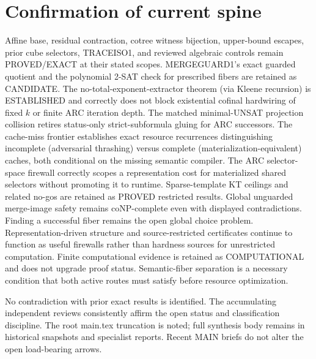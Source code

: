 \documentclass[11pt]{article}
\begin{document}
\section{Confirmation of current spine}
Affine base, residual contraction, cotree witness bijection, upper-bound escapes, prior cube selectors, TRACEISO1, and reviewed algebraic controls remain PROVED/EXACT at their stated scopes. MERGEGUARD1's exact guarded quotient and the polynomial 2-SAT check for prescribed fibers are retained as CANDIDATE. The no-total-exponent-extractor theorem (via Kleene recursion) is ESTABLISHED and correctly does not block existential cofinal hardwiring of fixed \(k\) or finite ARC iteration depth. The matched minimal-UNSAT projection collision retires status-only strict-subformula gluing for ARC successors. The cache-miss frontier establishes exact resource recurrences distinguishing incomplete (adversarial thrashing) versus complete (materialization-equivalent) caches, both conditional on the missing semantic compiler. The ARC selector-space firewall correctly scopes a representation cost for materialized shared selectors without promoting it to runtime. Sparse-template KT ceilings and related no-gos are retained as PROVED restricted results. Global unguarded merge-image safety remains coNP-complete even with displayed contradictions. Finding a successful fiber remains the open global choice problem. Representation-driven structure and source-restricted certificates continue to function as useful firewalls rather than hardness sources for unrestricted computation. Finite computational evidence is retained as COMPUTATIONAL and does not upgrade proof status. Semantic-fiber separation is a necessary condition that both active routes must satisfy before resource optimization.

No contradiction with prior exact results is identified. The accumulating independent reviews consistently affirm the open status and classification discipline. The root main.tex truncation is noted; full synthesis body remains in historical snapshots and specialist reports. Recent MAIN briefs do not alter the open load-bearing arrows.
\end{document}
